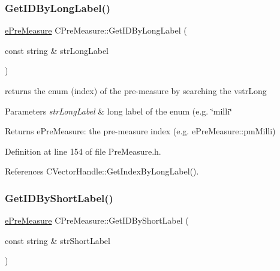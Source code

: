 \mbox{\label{classCPreMeasure_a5c47dca5a6bc34def68e6a2c7b4c5caa}} 
\subsubsection{\texorpdfstring{Get\+I\+D\+By\+Long\+Label()}{GetIDByLongLabel()}}
{\footnotesize\ttfamily \hyperlink{PreMeasure_8h_a6c81167b8d4c2badde42f81cb7214620}{e\+Pre\+Measure} C\+Pre\+Measure\+::\+Get\+I\+D\+By\+Long\+Label (\begin{DoxyParamCaption}\item[{const string \&}]{str\+Long\+Label }\end{DoxyParamCaption})\hspace{0.3cm}{\ttfamily [inline]}}



returns the enum (index) of the pre-\/measure by searching the vstr\+Long 


\begin{DoxyParams}{Parameters}
{\em str\+Long\+Label} & long label of the enum (e.\+g. \char`\"{}milli\char`\"{} \\
\hline
\end{DoxyParams}
\begin{DoxyReturn}{Returns}
e\+Pre\+Measure\+: the pre-\/measure index (e.\+g. e\+Pre\+Measure\+::pm\+Milli) 
\end{DoxyReturn}


Definition at line 154 of file Pre\+Measure.\+h.



References C\+Vector\+Handle\+::\+Get\+Index\+By\+Long\+Label().

\mbox{\label{classCPreMeasure_a6d9ee00647db5c9cb13e229c375096f8}} 
\subsubsection{\texorpdfstring{Get\+I\+D\+By\+Short\+Label()}{GetIDByShortLabel()}}
{\footnotesize\ttfamily \hyperlink{PreMeasure_8h_a6c81167b8d4c2badde42f81cb7214620}{e\+Pre\+Measure} C\+Pre\+Measure\+::\+Get\+I\+D\+By\+Short\+Label (\begin{DoxyParamCaption}\item[{const string \&}]{str\+Short\+Label }\end{DoxyParamCaption})\hspace{0.3cm}{\ttfamily [inline]}}



